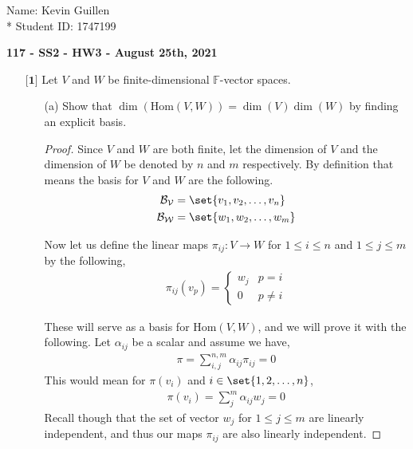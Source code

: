 \documentclass[12pt]{article}
\DeclarePairedDelimiter\set\{\}
\begin{document}
\begin{flushright}
    Name: Kevin Guillen \\*
    Student ID: 1747199
\end{flushright}
\begin{center}
    {\bf 117 - SS2 - HW3 - August 25th, 2021}
\end{center}

\begin{itemize}
    \item[$\textbf{[1]}$]
    Let $V$ and $W$ be finite-dimensional $\mathbb{F}$-vector spaces.
    \begin{itemize}
    
    \vspace{.3cm}
    \item[(a)]
    Show that $\dim(\text{Hom}(V,W)) = \dim(V)\dim(W)$ by finding an explicit basis.

    \begin{proof}
        Since $V$ and $W$ are both finite, let the dimension of $V$ and the dimension of $W$ be denoted by $n$ and $m$ respectively. By definition that means the basis for $V$ and $W$ are the following.
        \begin{align*}
            \mathcal{B_V} &= \set{v_1, v_2, \dots, v_n} \\
            \mathcal{B_W} &= \set{w_1, w_2, \dots, w_m}
        \end{align*} 

        Now let us define the linear maps $\pi_{ij}: V \to W$ for $1\leq i \leq n$ and $1 \leq j \leq m$ by the following,
        \begin{align*}
            \pi_{ij}(v_p)= \begin{cases}w_j & p = i \\ 0 & p\neq i \end{cases}
        \end{align*}

        These will serve as a basis for Hom$(V,W)$, and we will prove it with the following. Let $\alpha_{ij}$ be a scalar and assume we have,
        \begin{align*}
            \pi = \sum_{i,j}^{n,m} \alpha_{ij} \pi_{ij} = 0 
        \end{align*}
        This would mean for $\pi(v_i)$ and $i \in \set{1, 2, \dots, n}$,
        \begin{align*}
            \pi(v_i) = \sum_{j}^m \alpha_{ij} w_j = 0 
        \end{align*}
        Recall though that the set of vector $w_j$ for $1 \leq j \leq m$ are linearly independent, and thus our maps $\pi_{ij}$ are also linearly independent. 


\end{proof}
\end{itemize}
\end{itemize}
\end{document}
